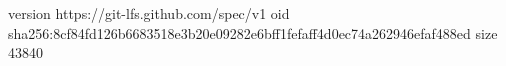 version https://git-lfs.github.com/spec/v1
oid sha256:8cf84fd126b6683518e3b20e09282e6bff1fefaff4d0ec74a262946efaf488ed
size 43840
